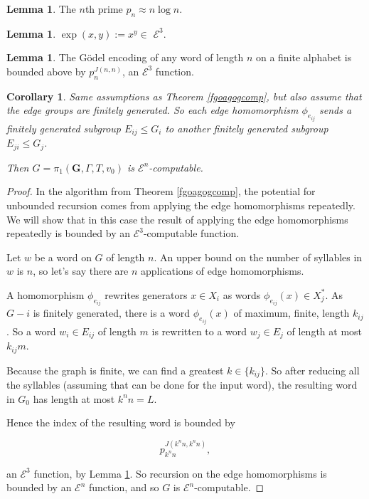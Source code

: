 \documentclass[a4paper]{article}
\newcommand{\grz}[1]{$\mathcal{E}^{#1}$}	%
\theoremstyle{plain}
\newtheorem{corollary}[theorem]{Corollary}
\theoremstyle{definition}
\newtheorem{lemma}[theorem]{Lemma}
\begin{document}
\begin{lemma}\label{primedist}
The $n$th prime $p_n \approx n \log n$.
\end{lemma}
\begin{lemma}\label{expine3}
$\exp(x,y) := x^y \in $ \grz{3}.
\end{lemma}
\begin{lemma}\label{godelbound}
The G\"odel encoding of any word of length $n$ on a finite alphabet is bounded above by $p_n^{J(n,n)}$, an \grz{3} function.
\end{lemma}

\begin{corollary}

Same assumptions as Theorem \ref{fgoagogcomp}, but also assume that the edge groups are finitely generated. So each edge homomorphism $\phi_{e_{ij}}$ sends a finitely generated subgroup $E_{ij} \leq G_i$ to another finitely generated subgroup $E_{ji} \leq G_j$.

Then $G = \pi_1(\mathbf{G}, \Gamma, T, v_0)$ is \grz{n}-computable.

\end{corollary}

\begin{proof}

In the algorithm from Theorem \ref{fgoagogcomp}, the potential for unbounded recursion comes from applying the edge homomorphisms repeatedly. We will show that in this case the result of applying the edge homomorphisms repeatedly is bounded by an \grz{3}-computable function.

Let $w$ be a word on $G$ of length $n$. An upper bound on the number of syllables in $w$ is $n$, so let's say there are $n$ applications of edge homomorphisms.

A homomorphism $\phi_{e_{ij}}$ rewrites generators $x \in X_i$ as words $\phi_{e_{ij}}(x) \in X_j^{\ast}$. As $G-i$ is finitely generated, there is a word $\phi_{e_{ij}}(x)$ of maximum, finite, length $k_{ij}$. So a word $w_i \in E_{ij}$ of length $m$ is rewritten to a word $w_j \in E_j$ of length at most $k_{ij}m$.

Because the graph is finite, we can find a greatest $k \in \{k_{ij}\}$. So after reducing all the syllables (assuming that can be done for the input word), the resulting word in $G_0$ has length at most $k^n n = L$.

Hence the index of the resulting word is bounded by

\[ p_{k^nn}^{J(k^nn,k^nn)},\]

an \grz{3} function, by Lemma \ref{godelbound}. So recursion on the edge homomorphisms is bounded by an \grz{n} function, and so $G$ is \grz{n}-computable.

\end{proof}
\end{document}
